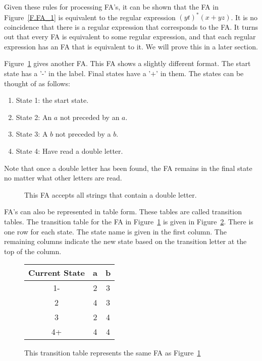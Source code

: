 \documentclass[letterpaper,12pt,openany,reqno]{book}%
\newcommand{\fanonterminalnode}[2] {\node at (#1) (#2) [circle, draw, minimum size=24pt] {#2};}
\newcommand{\fatransition}[3] {\draw [->] (#1) -- (#2) node [midway, above] {#3};}
\newcommand{\faarctransition}[5] {\draw [->] (#1) to[out=#4, in=#5] node  [midway, above] {#3} (#2) ;}
\newcommand{\faloopright}[2] {\draw (#1) edge [loop right] node {#2} ();}
\begin{document}
Given these rules for processing FA's, it can be shown that the FA in Figure~\ref{F.FA_1} is equivalent to the regular expression $(yt)^* (x + yz)$. It is no coincidence that there is a regular expression that corresponds to the FA. It turns out that every FA is equivalent to some regular expression, and that each regular expression has an FA that is equivalent to it. We will prove this in a later section.

Figure~\ref{F.FA_2} gives another FA. This FA shows a slightly different format. The start state has a '-' in the label. Final states have a '$+$' in them. The states can be thought of as follows:
\begin{enumerate}
\item State 1: the start state.
\item State 2: An $a$ not preceded by an $a$.
\item State 3: A $b$ not preceded by a $b$.
\item State 4: Have read a double letter.
\end{enumerate}
Note that once a double letter has been found, the FA remains in the final state no matter what other letters are read.

\begin{figure}[hbt]
\centering
{}
 \caption[FA for double letters]{This FA accepts all strings that contain a double letter.}
  \label{F.FA_2}
\end{figure}

FA's can also be represented in table form. These tables are called transition tables. The transition table for the FA in Figure~\ref{F.FA_2} is given in Figure~\ref{T.FA.2}. There is one row for each state. The state name is given in the first column. The remaining columns indicate the new state based on the transition letter at the top of the column.

\begin{figure}[hbt]
\centering
\begin{tabular}{|c|c|c|}
\hline
Current State & a & b \\
\hline
1- & 2 & 3 \\
\hline
2 & 4 & 3 \\
\hline
3 & 2 & 4 \\
\hline
4+ & 4 & 4 \\
\hline
\end{tabular}
\caption[Transition Table]{This transition table represents the same FA as Figure~\ref{F.FA_2}}
\label{T.FA.2}
\end{figure}
\end{document}

